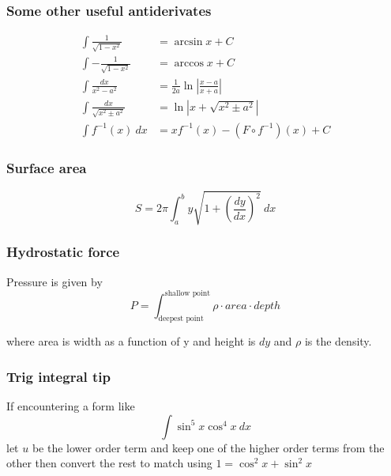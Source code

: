\documentclass{article}
\begin{document}
\begin{multicols}{2}
\subsubsection*{Some other useful antiderivates}
\begin{align*}
	\int \frac{1}{\sqrt{1-x^2}} &= \arcsin x + C \\
	\int -\frac{1}{\sqrt{1-x^2}} &= \arccos x + C \\
	\int \frac{dx}{x^2-a^2} &= \frac{1}{2a} \ln \left| \frac{x-a}{x+a} \right| \\
	\int \frac{dx}{\sqrt{x^2 \pm a^2}} &= \ln \left| x + \sqrt{x^2 \pm a^2} \right| \\
	\int f^{-1}(x) \ dx &= x f^{-1}(x) - (F \circ f^{-1})(x) + C
\end{align*}

\subsubsection*{Surface area}
\[
	S = 2\pi \int_a^b y \sqrt{1+\left( \frac{dy}{dx} \right)^2}\ dx
\]

\subsubsection*{Hydrostatic force}
Pressure is given by
\[
	P = \int_\text{deepest point}^\text{shallow point} \rho \cdot area \cdot depth
\]

where area is width as a function of y and height is $dy$ and $\rho$ is the density.

\subsubsection*{Trig integral tip}
If encountering a form like
\[
	\int \sin^5 x \cos^4 x\ dx
\]
let $u$ be the lower order term and keep one of the higher order terms from the other then convert the rest to match using $1 = \cos^2 x + \sin^2 x$

\end{multicols}
\end{document}
